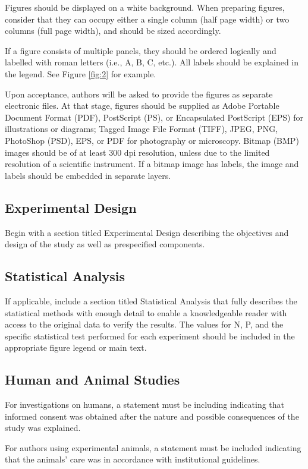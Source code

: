 \documentclass{article}
\begin{document}
Figures should be displayed on a white background. When preparing figures, consider that they can occupy either a single column (half page width) or two columns (full page width), and should be sized accordingly.

If a figure consists of multiple panels, they should be ordered logically and labelled with roman letters (i.e., A, B, C, etc.). All labels should be explained in the legend. See Figure \ref{fig:2} for example.

Upon acceptance, authors will be asked to provide the figures as separate electronic files. At that stage, figures should be supplied as Adobe Portable Document Format (PDF), PostScript (PS), or Encapsulated PostScript (EPS) for illustrations or diagrams; Tagged Image File Format (TIFF), JPEG, PNG, PhotoShop (PSD), EPS, or PDF for photography or microscopy. Bitmap (BMP) images should be of at least 300 dpi resolution, unless due to the limited resolution of a scientific instrument. If a bitmap image has labels, the image and labels should be embedded in separate layers.

\subsection{Experimental Design}
Begin with a section titled Experimental Design describing the objectives and design of the study as well as prespecified components. 

\subsection{Statistical Analysis}
If applicable, include a section titled Statistical Analysis that fully describes the statistical methods with enough detail to enable a knowledgeable reader with access to the original data to verify the results. The values for N, P, and the specific statistical test performed for each experiment should be included in the appropriate figure legend or main text. 

\subsection{Human and Animal Studies}
For investigations on humans, a statement must be including indicating that informed consent was obtained after the nature and possible consequences of the study was explained.

For authors using experimental animals, a statement must be included indicating that the animals’ care was in accordance with institutional guidelines.
\end{document}
